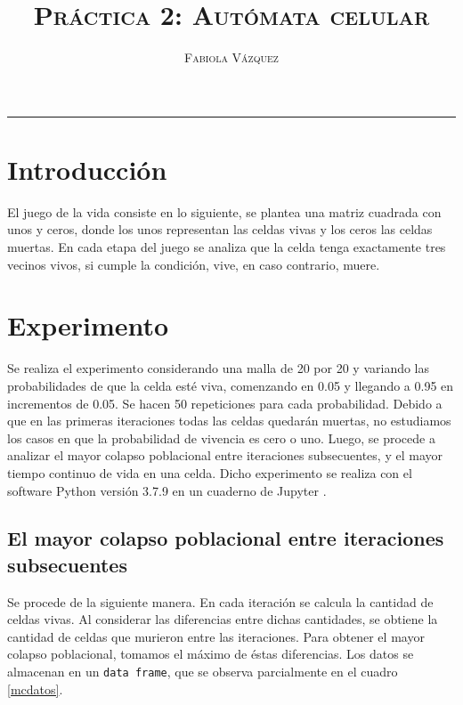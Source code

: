 \documentclass[12pt,letterpaper]{article}
\title{\textsc{Práctica 2: Autómata celular}}
\author{\textsc{Fabiola Vázquez}}
\begin{document}
\maketitle

\hrule
\section{Introducción}
El juego de la vida \cite{gamelife} consiste en lo siguiente, se plantea una matriz cuadrada con unos y ceros, donde los unos representan las celdas vivas y los ceros las celdas muertas. En cada etapa del juego se analiza que la celda tenga exactamente tres vecinos vivos, si cumple la condición, vive, en caso contrario, muere. 


\section{Experimento}
Se realiza el experimento \cite{elisap2} considerando una malla de 20 por 20 y variando las probabilidades de que la celda esté viva, comenzando en 0.05 y llegando a 0.95 en incrementos de 0.05. Se hacen 50 repeticiones para cada probabilidad. Debido a que en las primeras iteraciones todas las celdas quedarán muertas, no estudiamos los casos en que la probabilidad de vivencia es cero o uno. Luego, se procede a analizar el mayor colapso poblacional entre iteraciones subsecuentes, y el mayor tiempo continuo de vida en una celda.
Dicho experimento se realiza con el software Python versión 3.7.9 \cite{python} en un cuaderno de Jupyter \cite{jupyter}.

\subsection{El mayor colapso poblacional entre iteraciones subsecuentes}
Se procede de la siguiente manera. En cada iteración se calcula la cantidad de celdas vivas. Al considerar las diferencias entre dichas cantidades, se obtiene la cantidad de celdas que murieron entre las iteraciones. Para obtener el mayor colapso poblacional,  tomamos el máximo de éstas diferencias. Los datos se almacenan en un \texttt{data frame}, que se observa parcialmente en el cuadro \ref{mcdatos}.
\end{document}
